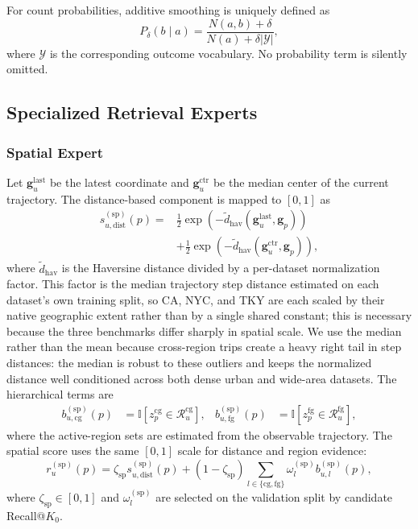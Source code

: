 \documentclass[journal]{IEEEtran}
\newcommand{\Ind}{\mathbb{I}}
\begin{document}
For count probabilities, additive smoothing is uniquely defined as
\begin{equation}
P_{\delta}(b\mid a)
=
\frac{N(a,b)+\delta}{N(a)+\delta|\mathcal{Y}|},
\label{eq:additive_smoothing}
\end{equation}
where $\mathcal{Y}$ is the corresponding outcome vocabulary.
No probability term is silently omitted.

\subsection{Specialized Retrieval Experts}
\label{subsec:experts}

\subsubsection{Spatial Expert}

Let $\bm{g}_{u}^{\mathrm{last}}$ be the latest coordinate and
$\bm{g}_{u}^{\mathrm{ctr}}$ be the median center of the current trajectory.
The distance-based component is mapped to $[0,1]$ as
\begin{equation}
\begin{aligned}
s_{u,\mathrm{dist}}^{(\mathrm{sp})}(p)
={}&\frac{1}{2}\exp\!\left(-\widetilde d_{\mathrm{hav}}
(\bm{g}_{u}^{\mathrm{last}},\bm{g}_{p})\right)\\
&+\frac{1}{2}\exp\!\left(-\widetilde d_{\mathrm{hav}}
(\bm{g}_{u}^{\mathrm{ctr}},\bm{g}_{p})\right),
\end{aligned}
\label{eq:spatial_exact}
\end{equation}
where $\widetilde d_{\mathrm{hav}}$ is the Haversine distance divided by a
per-dataset normalization factor. This factor is the median trajectory step
distance estimated on each dataset's own training split, so CA, NYC, and TKY
are each scaled by their native geographic extent rather than by a single
shared constant; this is necessary because the three benchmarks differ sharply
in spatial scale. We use the median rather than the mean because cross-region
trips create a heavy right tail in step distances: the median is robust to
these outliers and keeps the normalized distance well conditioned across both
dense urban and wide-area datasets.
The hierarchical terms are
\begin{align}
b_{u,\mathrm{cg}}^{(\mathrm{sp})}(p)
&=
\Ind[z_p^{\mathrm{cg}}\in\mathcal{R}_{u}^{\mathrm{cg}}],
&
b_{u,\mathrm{fg}}^{(\mathrm{sp})}(p)
&=
\Ind[z_p^{\mathrm{fg}}\in\mathcal{R}_{u}^{\mathrm{fg}}],
\label{eq:spatial_backoff}
\end{align}
where the active-region sets are estimated from the observable trajectory.
The spatial score uses the same $[0,1]$ scale for distance and region evidence:
\begin{equation}
r_u^{(\mathrm{sp})}(p)
=
\zeta_{\mathrm{sp}}s_{u,\mathrm{dist}}^{(\mathrm{sp})}(p)
+
(1-\zeta_{\mathrm{sp}})
\sum_{l\in\{\mathrm{cg},\mathrm{fg}\}}
\omega_l^{(\mathrm{sp})}b_{u,l}^{(\mathrm{sp})}(p),
\label{eq:spatial_fusion}
\end{equation}
where $\zeta_{\mathrm{sp}}\in[0,1]$ and $\omega_l^{(\mathrm{sp})}$ are selected
on the validation split by candidate Recall@$K_0$.
\end{document}

